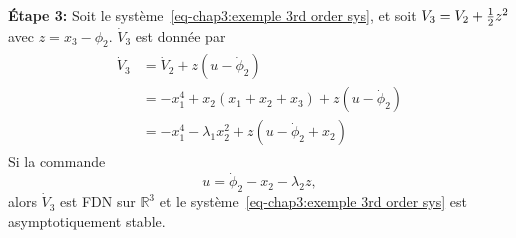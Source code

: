 \begin{example}
   \textbf{Étape 3:} Soit le système~\eqref{eq-chap3:exemple 3rd order sys}, et soit $V_3=V_2 + \frac{1}{2} z^2$ avec $z = x_3-\phi_2$. $\dot{V}_3$ est donnée par 
   \begin{align}
	   	\begin{split}
	   		\dot{V}_3 &= \dot{V}_2 + z\left(u-\dot{\phi}_2\right)\\
	   		&= -x_1^4 + x_2\left(x_1 +x_2 + x_3\right)+ z\left(u-\dot{\phi}_2\right) \\ 
	   		&= -x_1^4 -\lambda_1x_2^2 + z\left(u-\dot{\phi}_2+x_2\right)  
	   	\end{split}
   \end{align}
   Si la commande 
   \begin{equation}
   	u = \dot{\phi}_2-x_2-\lambda_2z,
   \end{equation} 
   alors $\dot{V}_3$ est FDN sur $\mathbb{R}^3$ et le système~\eqref{eq-chap3:exemple 3rd order sys} est asymptotiquement stable.
\end{example}

